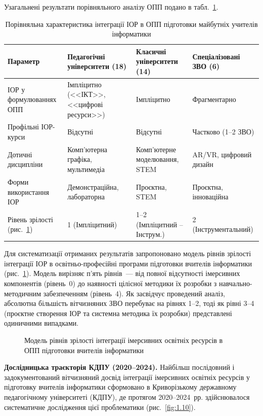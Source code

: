 Узагальнені результати порівняльного аналізу ОПП подано в табл.~\ref{tab:opp_comparison}.

\begin{table}[!h]
\caption{Порівняльна характеристика інтеграції ІОР в ОПП підготовки майбутніх учителів інформатики}
\label{tab:opp_comparison}
\centering\small
\begin{tabular}{|p{3.2cm}|p{3.4cm}|p{3.4cm}|p{3.4cm}|}
\hline
\textbf{Параметр} & \textbf{Педагогічні університети (18)} & \textbf{Класичні університети (14)} & \textbf{Спеціалізовані ЗВО (6)} \\
\hline
ІОР у формулюваннях ОПП & Імпліцитно (<<ІКТ>>, <<цифрові ресурси>>) & Імпліцитно & Фрагментарно \\
\hline
Профільні ІОР-курси & Відсутні & Відсутні & Частково (1--2 ЗВО) \\
\hline
Дотичні дисципліни & Комп'ютерна графіка, мультимедіа & Комп'ютерне моделювання, STEM & AR/VR, цифровий дизайн \\
\hline
Форми використання ІОР & Демонстраційна, лабораторна & Проєктна, STEM & Проєктна, інноваційна \\
\hline
Рівень зрілості (рис.~\ref{fig:1.9}) & 1 (Імпліцитний) & 1--2 (Імпліцитний -- Інструм.) & 2 (Інструментальний) \\
\hline
\end{tabular}
\end{table}

Для систематизації отриманих результатів запропоновано модель рівнів зрілості інтеграції ІОР в освітньо-професійні програми підготовки вчителів інформатики (рис.~\ref{fig:1.9}). Модель вирізняє п'ять рівнів~--- від повної відсутності імерсивних компонентів (рівень~0) до наявності цілісної методики їх розробки з навчально-методичним забезпеченням (рівень~4). Як засвідчує проведений аналіз, абсолютна більшість вітчизняних ЗВО перебуває на рівнях 1--2, тоді як рівні 3--4 (проєктне створення ІОР та системна методика їх розробки) представлені одиничними випадками.

\begin{figure}[!h]
\centering

\caption{Модель рівнів зрілості інтеграції імерсивних освітніх ресурсів в ОПП підготовки вчителів інформатики}
\label{fig:1.9}
\end{figure}

\textbf{Дослідницька траєкторія КДПУ (2020--2024).} Найбільш послідовний і задокументований вітчизняний досвід інтеграції імерсивних освітніх ресурсів у підготовку вчителів інформатики сформовано в Криворізькому державному педагогічному університеті (КДПУ), де протягом 2020--2024~рр. здійснювалося систематичне дослідження цієї проблематики (рис.~\ref{fig:1.10}).

